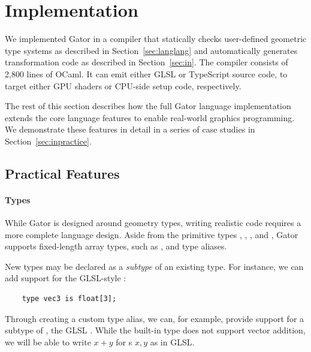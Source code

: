 \documentclass[../main.tex]{subfiles}
\begin{document}
\section{Implementation}
\label{sec:practice}

We implemented Gator in a compiler that statically checks user-defined geometric type systems as described in Section~\ref{sec:langlang} and automatically generates transformation code as described in Section~\ref{sec:in}.
The compiler consists of 2,800 lines of OCaml.
It can emit either GLSL or TypeScript source code, to target either GPU shaders or CPU-side setup code, respectively.

The rest of this section describes how the full Gator language implementation extends the core language features to enable real-world graphics programming.
We demonstrate these features in detail in a series of case studies in Section~\ref{sec:inpractice}.

\subsection{Practical Features}
\label{sec:target}
\paragraph{Types}

While Gator is designed around geometry types, writing realistic code requires a more complete language design.
Aside from the primitive types , , , and , Gator supports fixed-length array types, such as , and type aliases.

New types may be declared as a \emph{subtype} of an existing type.
For instance, we can add support for the GLSL-style :
%
\begin{lstlisting}
	type vec3 is float[3];
\end{lstlisting}
%
Through creating a custom type alias, we can, for example, provide support for a subtype of , the GLSL .
While the built-in  type does not support vector addition, we will be able to write $x+y$ for s $x,y$ as in GLSL.
\end{document}
